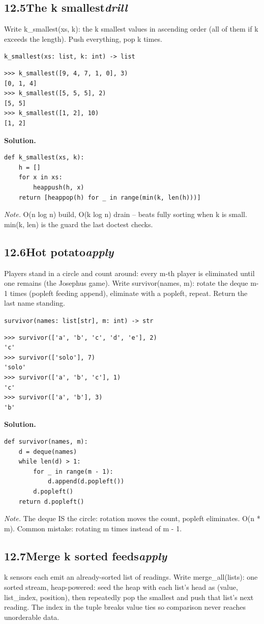 \documentclass[10pt,letterpaper]{book}
\begin{document}
\subsection*{12.5\quad The k smallest\hfill\textnormal{\textit{drill}}}
Write k\_smallest(xs, k): the k smallest values in ascending order (all of them if k exceeds the length). Push everything, pop k times.

\noindent\texttt{k\_smallest(xs: list, k: int) -> list}
\begin{lstlisting}[style=ex]
>>> k_smallest([9, 4, 7, 1, 0], 3)
[0, 1, 4]
>>> k_smallest([5, 5, 5], 2)
[5, 5]
>>> k_smallest([1, 2], 10)
[1, 2]
\end{lstlisting}
\noindent\textbf{Solution.}
\begin{lstlisting}[style=code]
def k_smallest(xs, k):
    h = []
    for x in xs:
        heappush(h, x)
    return [heappop(h) for _ in range(min(k, len(h)))]
\end{lstlisting}
\noindent\textit{Note.} O(n log n) build, O(k log n) drain -- beats fully sorting when k is small. min(k, len) is the guard the last doctest checks.

\subsection*{12.6\quad Hot potato\hfill\textnormal{\textit{apply}}}
Players stand in a circle and count around: every m-th player is eliminated until one remains (the Josephus game). Write survivor(names, m): rotate the deque m-1 times (popleft feeding append), eliminate with a popleft, repeat. Return the last name standing.

\noindent\texttt{survivor(names: list[str], m: int) -> str}
\begin{lstlisting}[style=ex]
>>> survivor(['a', 'b', 'c', 'd', 'e'], 2)
'c'
>>> survivor(['solo'], 7)
'solo'
>>> survivor(['a', 'b', 'c'], 1)
'c'
>>> survivor(['a', 'b'], 3)
'b'
\end{lstlisting}
\noindent\textbf{Solution.}
\begin{lstlisting}[style=code]
def survivor(names, m):
    d = deque(names)
    while len(d) > 1:
        for _ in range(m - 1):
            d.append(d.popleft())
        d.popleft()
    return d.popleft()
\end{lstlisting}
\noindent\textit{Note.} The deque IS the circle: rotation moves the count, popleft eliminates. O(n * m). Common mistake: rotating m times instead of m - 1.

\subsection*{12.7\quad Merge k sorted feeds\hfill\textnormal{\textit{apply}}}
k sensors each emit an already-sorted list of readings. Write merge\_all(lists): one sorted stream, heap-powered: seed the heap with each list's head as (value, list\_index, position), then repeatedly pop the smallest and push that list's next reading. The index in the tuple breaks value ties so comparison never reaches unorderable data.
\end{document}
